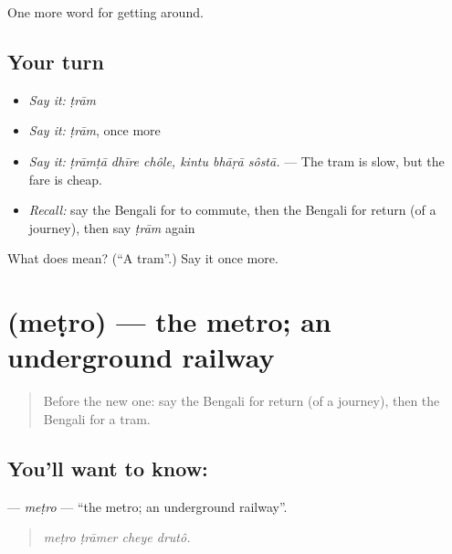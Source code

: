 \begin{grammarlens}[title={What you've built}]
One more word for getting around.
\end{grammarlens}

\subsection*{Your turn}
\begin{itemize}
\raggedright
  \item \emph{Say it:} \emph{ṭrām}
  \item \emph{Say it:} \emph{ṭrām}, once more
  \item \emph{Say it:} \emph{ṭrāmṭā dhīre chôle, kintu bhāṛā sôstā.} — The tram is slow, but the fare is cheap.
  \item \emph{Recall:} say the Bengali for to commute, then the Bengali for return (of a journey), then say \emph{ṭrām} again
\end{itemize}

\begin{tcolorbox}[breakable,colback=teal!4,colframe=teal!35!black,title={Before you move on}]
What does  mean? (\textquotedblleft{}A tram\textquotedblright{}.) Say it once more.
\end{tcolorbox}
\section[\texorpdfstring{\bn{মেট্রো} (meṭro)}{মেট্রো (meṭro)}]{ (meṭro) — the metro; an underground railway}

\label{lesson:BN-C388-metro}



\begin{quote}
Before the new one: say the Bengali for return (of a journey), then the Bengali for a tram.
\end{quote}

\subsection*{You'll want to know: }
\textbf{} — \emph{meṭro} — \textquotedblleft{}the metro; an underground railway\textquotedblright{}.

\begin{quote}
   
\end{quote}

\begin{quote}
\emph{meṭro ṭrāmer cheye drutô.}
\end{quote}


